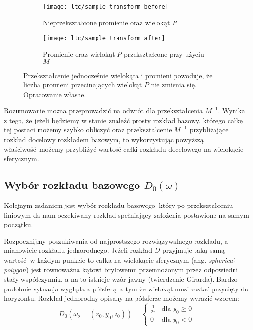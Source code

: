 \documentclass[../main.tex]{subfiles}
\begin{document}
\begin{figure}
    \centering
    \begin{subfigure}[t]{0.45\textwidth}
        \texttt{[image: ltc/sample\_transform\_before]}
        \label{fig:LTCTransformBefore}
        \caption{Nieprzekształcone promienie oraz wielokąt $P$}
    \end{subfigure}
    \hspace{0.05\textwidth}
    \begin{subfigure}[t]{0.45\textwidth}
        \centering
        \texttt{[image: ltc/sample\_transform\_after]}
        \label{fig:LTCTransformAfter}
        \caption{Promienie oraz wielokąt $P$ przekształcone przy użyciu $M$}
    \end{subfigure}
    
    \caption{Przekształcenie jednocześnie wielokąta i promieni powoduje, że liczba promieni przecinających wielokąt $P$ nie zmienia się. Opracowanie własne.}
    \label{fig:LTCTransformBeforeAfter}
\end{figure}

Rozumowanie można przeprowadzić na odwrót dla przekształcenia $M^{-1}$. Wynika z tego, że jeżeli będziemy w stanie znaleźć prosty rozkład bazowy, którego całkę tej postaci możemy szybko obliczyć oraz przekształcenie $M^{-1}$ przybliżające rozkład docelowy rozkładem bazowym, to wykorzystując powyższą właściwość możemy przybliżyć wartość całki rozkładu docelowego na wielokącie sferycznym.


\subsection{Wybór rozkładu bazowego $D_0(\omega)$}

Kolejnym zadaniem jest wybór rozkładu bazowego, który po przekształceniu liniowym da nam oczekiwany rozkład spełniający założenia postawione na samym początku.

Rozpocznijmy poszukiwania od najprostszego rozwiązywalnego rozkładu, a mianowicie rozkładu jednorodnego. Jeżeli rozkład $D$ przyjmuje taką samą wartość w każdym punkcie to całka na wielokącie sferycznym (ang. \textit{spherical polygon}) jest równoważna kątowi bryłowemu przemnożonym przez odpowiedni stały współczynnik, a na to istnieje wzór jawny \cite{Arvo,Snyder} (twierdzenie Girarda). Bardzo podobnie sytuacja wygląda z półsferą, z tym że wielokąt musi zostać przycięty do horyzontu. Rozkład jednorodny opisany na półsferze możemy wyrazić wzorem:
\[
D_0(\omega_o=(x_0, y_0, z_0)) = \begin{cases}
  \frac{1}{2\pi} & \text{dla } y_0 \geq 0 \\
  0 & \text{dla } y_0 < 0
\end{cases}
\]
\end{document}
